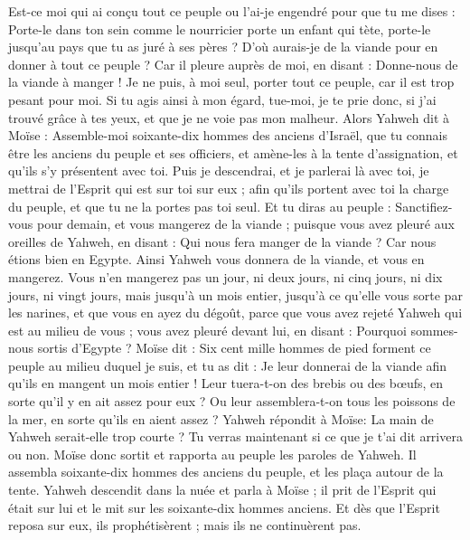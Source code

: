 \begin{multicols}{2}
Est-ce moi qui ai conçu tout ce peuple ou l'ai-je engendré pour que tu me dises : Porte-le dans ton sein comme le nourricier porte un enfant qui tète, porte-le jusqu'au pays que tu as juré à ses pères ?
D'où aurais-je de la viande pour en donner à tout ce peuple ? Car il pleure auprès de moi, en disant : Donne-nous de la viande à manger !
Je ne puis, à moi seul, porter tout ce peuple, car il est trop pesant pour moi.
Si tu agis ainsi à mon égard, tue-moi, je te prie donc, si j'ai trouvé grâce à tes yeux, et que je ne voie pas mon malheur.
Alors Yahweh dit à Moïse : Assemble-moi soixante-dix hommes des anciens d'Israël, que tu connais être les anciens du peuple et ses officiers, et amène-les à la tente d'assignation, et qu'ils s'y présentent avec toi.
Puis je descendrai, et je parlerai là avec toi, je mettrai de l'Esprit qui est sur toi sur eux ; afin qu'ils portent avec toi la charge du peuple, et que tu ne la portes pas toi seul.
Et tu diras au peuple : Sanctifiez-vous pour demain, et vous mangerez de la viande ; puisque vous avez pleuré aux oreilles de Yahweh, en disant : Qui nous fera manger de la viande ? Car nous étions bien en Egypte. Ainsi Yahweh vous donnera de la viande, et vous en mangerez.
Vous n'en mangerez pas un jour, ni deux jours, ni cinq jours, ni dix jours, ni vingt jours,
mais jusqu'à un mois entier, jusqu'à ce qu'elle vous sorte par les narines, et que vous en ayez du dégoût, parce que vous avez rejeté Yahweh qui est au milieu de vous ; vous avez pleuré devant lui, en disant : Pourquoi sommes-nous sortis d'Egypte ?
Moïse dit : Six cent mille hommes de pied forment ce peuple au milieu duquel je suis, et tu as dit : Je leur donnerai de la viande afin qu'ils en mangent un mois entier !
Leur tuera-t-on des brebis ou des bœufs, en sorte qu'il y en ait assez pour eux ? Ou leur assemblera-t-on tous les poissons de la mer, en sorte qu'ils en aient assez ?
Yahweh répondit à Moïse: La main de Yahweh serait-elle trop courte ? Tu verras maintenant si ce que je t'ai dit arrivera ou non.
Moïse donc sortit et rapporta au peuple les paroles de Yahweh. Il assembla soixante-dix hommes des anciens du peuple, et les plaça autour de la tente.
Yahweh descendit dans la nuée et parla à Moïse ; il prit de l'Esprit qui était sur lui et le mit sur les soixante-dix hommes anciens. Et dès que l'Esprit reposa sur eux, ils prophétisèrent ; mais ils ne continuèrent pas.

\end{multicols}

